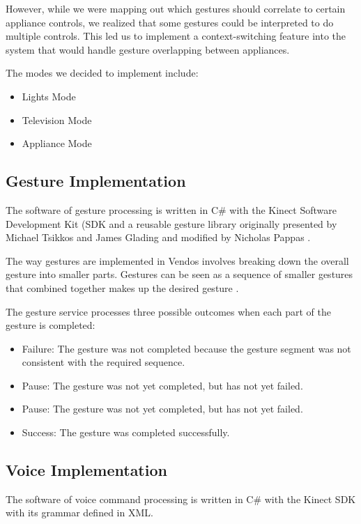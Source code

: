 \documentclass{chi-ext}
\begin{document}
However, while we were mapping out which gestures should correlate to certain appliance controls, we realized that some gestures could be interpreted to do multiple controls.
This led us to implement a context-switching feature into the system that would handle gesture overlapping between appliances.
 
The modes we decided to implement include:
\begin{itemize}\compresslist
\item
Lights Mode
\item
Television Mode
\item
Appliance Mode
\end{itemize}
 
\subsection{Gesture Implementation}
 
The software of gesture processing is written in C\# with the Kinect Software Development Kit (SDK and a reusable gesture library originally presented by Michael Tsikkos and James Glading and modified by Nicholas Pappas \cite{_writing}.
 
The way gestures are implemented in Vendos involves breaking down the overall gesture into smaller parts.
Gestures can be seen as a sequence of smaller gestures that combined together makes up the desired gesture \cite{_writing}.
 
The gesture service processes three possible outcomes when each part of the gesture is completed:
\begin{itemize}\compresslist
\item
Failure: The gesture was not completed because the gesture segment was not consistent with the required sequence.
\item
Pause: The gesture was not yet completed, but has not yet failed.
\item
Pause: The gesture was not yet completed, but has not yet failed.
\item
Success: The gesture was completed successfully.
\end{itemize}
 
\subsection{Voice Implementation}
 
The software of voice command processing is written in C\# with the Kinect SDK with its grammar defined in XML.
 
\end{document}
